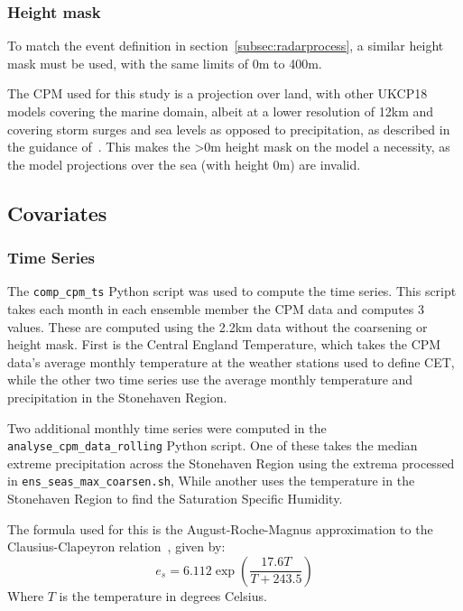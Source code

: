 \subsubsection{Height mask}

To match the event definition in section~\ref{subsec:radarprocess},
    a similar height mask must be used,
    with the same limits of 0m to 400m.

The CPM used for this study is a projection over land,
    with other UKCP18 models covering the marine domain,
    albeit at a lower resolution of 12km and covering storm surges and sea levels as opposed to precipitation,
    as described in the guidance of~\cite{model_data}.
This makes the >0m height mask on the model a necessity,
    as the model projections over the sea (with height 0m) are invalid.

\subsection{Covariates}\label{subsec:covfit}

\subsubsection{Time Series}

The \texttt{comp\_cpm\_ts} Python script was used to compute the time series.
This script takes each month in each ensemble member the CPM data and computes 3 values.
These are computed using the 2.2km data without the coarsening or height mask.
First is the Central England Temperature,
    which takes the CPM data's average monthly temperature at the weather stations used to define CET,
    while the other two time series use the average monthly temperature and precipitation in the Stonehaven Region.

Two additional monthly time series were computed in the \texttt{analyse\_cpm\_data\_rolling} Python script.
One of these takes the median extreme precipitation across the Stonehaven Region
    using the extrema processed in \texttt{ens\_seas\_max\_coarsen.sh},
While another uses the temperature in the Stonehaven Region to find the Saturation Specific Humidity.

The formula used for this is the August-Roche-Magnus approximation to the Clausius-Clapeyron relation~\cite{Alduchov_Eskridge_1996}, given by:
\begin{equation}\label{eq:qsat}
    e_s = 6.112 \exp\left( \frac{17.6 T}{T + 243.5} \right)
\end{equation}
Where $T$ is the temperature in degrees Celsius.

